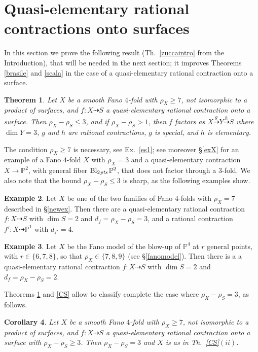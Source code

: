 \documentclass[a4paper,12pt]{amsart}
\newtheorem{thm}{Theorem}[section]
\newtheorem{corollary}[thm]{Corollary}
\theoremstyle{definition}
\newtheorem{example}[thm]{Example}
\numberwithin{figure}{section}
\numberwithin{table}{section}
\newcommand{\pr}{\mathbb{P}}
\newcommand{\Bl}{\operatorname{Bl}}
\newcommand{\pts}{\text{\it pts}}
\begin{document}
\section{Quasi-elementary rational contractions onto surfaces}\label{seczucca}
\noindent In this section we prove the following result (Th.~\ref{zuccaintro} from the Introduction), that will be needed in the next section; it improves Theorems \ref{brasile} and \ref{scala} in the case of a quasi-elementary rational contraction onto a surface.
\begin{thm}\label{zucca}
  Let $X$ be a smooth Fano $4$-fold with $\rho_X\geq 7$, not isomorphic to a product of surfaces, and  $f\colon X\dasharrow S$ a quasi-elementary rational contraction onto a surface.  
  Then $\rho_X-\rho_S\leq 3$, and if $\rho_X-\rho_S>1$, then $f$ factors as $X\stackrel{g}{\dasharrow}Y\stackrel{h}{\dasharrow} S$ where $\dim Y=3$,
  $g$ and $h$ are rational contractions, $g$ is special, and $h$
is elementary. 
\end{thm}
The condition $\rho_X\geq 7$ is necessary, see Ex.~\ref{es1}; see moreover \S\ref{exX} for an example of a Fano $4$-fold $X$ with $\rho_X=3$ and a quasi-elementary contraction $X\to\pr^2$, with general fiber $\Bl_{2\mskip1mu\pts}\pr^2$, that does not factor through a $3$-fold. We also note that the bound $\rho_X-\rho_S\leq 3$ is sharp, as the following examples show.
\begin{example}\label{es3}
  Let $X$ be one of the two families of Fano $4$-folds with $\rho_X=7$ described in \S\ref{newex}. Then there are a
   quasi-elementary rational contraction  $f\colon X\dasharrow S$
  with $\dim S=2$ and 
    $d_f=\rho_X-\rho_S=3$, and
      a rational contraction $f'\colon X\dasharrow\pr^1$ with $d_{f'}=4$.
\end{example}  
\begin{example}
  Let $X$ be the Fano model of the blow-up of $\pr^4$ at $r$ general points, with $r\in\{6,7,8\}$, so that $\rho_X\in\{7,8,9\}$ (see \S\ref{fanomodel}). Then there is a
  a quasi-elementary rational contraction $f\colon X\dasharrow S$
  with $\dim S=2$ and   $d_f=\rho_X-\rho_S=2$. 
\end{example}
Theorems \ref{zucca} and \ref{CS} allow to classify complete the case where $\rho_X-\rho_S= 3$, as follows.
\begin{corollary}
 Let $X$ be a smooth Fano $4$-fold with $\rho_X\geq 7$, not isomorphic to a product of surfaces, and  $f\colon X\dasharrow S$ a quasi-elementary rational contraction onto a surface with  
  $\rho_X-\rho_S\geq 3$. Then $\rho_X-\rho_S= 3$ and $X$ is as in Th.~\ref{CS}$(ii)$.
\end{corollary}
\end{document}

